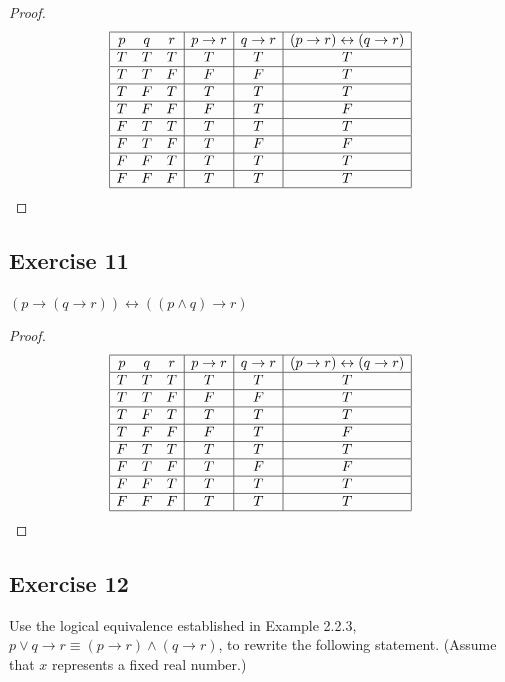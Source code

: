 \documentclass[14pt]{extarticle}
\newcommand{\bic}{\leftrightarrow}
\begin{document}
\begin{proof}
$$
\begin{array}{|ccc|c|c|c|}
\hline
p & q & r & p \to r & q \to r & (p \to r) \bic (q \to r) \\
\hline
T & T & T & T & T & T \\
\hline
T & T & F & F & F & T \\
\hline
T & F & T & T & T & T \\
\hline
T & F & F & F & T & F \\
\hline
F & T & T & T & T & T \\
\hline
F & T & F & T & F & F \\
\hline
F & F & T & T & T & T \\
\hline
F & F & F & T & T & T \\
\hline
\end{array}
$$
\end{proof}

\subsection{Exercise 11}
$(p \to (q \to r)) \bic ((p \wedge q) \to r)$

\begin{proof}
$$
\begin{array}{|ccc|c|c|c|}
\hline
p & q & r & p \to r & q \to r & (p \to r) \bic (q \to r) \\
\hline
T & T & T & T & T & T \\
\hline
T & T & F & F & F & T \\
\hline
T & F & T & T & T & T \\
\hline
T & F & F & F & T & F \\
\hline
F & T & T & T & T & T \\
\hline
F & T & F & T & F & F \\
\hline
F & F & T & T & T & T \\
\hline
F & F & F & T & T & T \\
\hline
\end{array}
$$
\end{proof}

\subsection{Exercise 12}
Use the logical equivalence established in Example 2.2.3, $p \vee q \to r \equiv
(p \to r) \wedge (q \to r)$, to rewrite the following statement. (Assume that
$x$ represents a fixed real number.)
\end{document}
